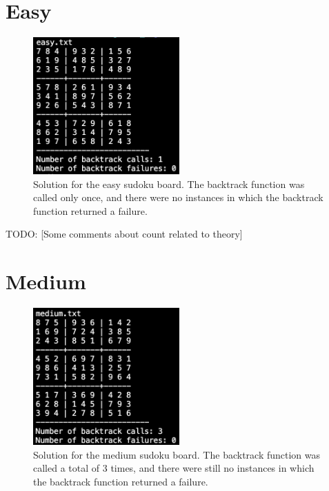 \documentclass{article}
\begin{document}
    \mainmatter

    \section*{Easy}

    \begin{figure}[H]
        \centering
        \includegraphics[width=0.5\textwidth]{Images/easy.png}
        \caption[Easy solution]{Solution for the easy sudoku board. The backtrack function was called only once, and there were no instances in which the backtrack function returned a failure.}
        \label{fig:Easy solution}
    \end{figure}

    TODO: [Some comments about count related to theory]

    \section*{Medium}

    \begin{figure}[H]
        \centering
        \includegraphics[width=0.5\textwidth]{Images/medium.png}
        \caption[Medium solution]{Solution for the medium sudoku board. The backtrack function was called a total of 3 times, and there were still no instances in which the backtrack function returned a failure.}
        \label{fig:Medium solution}
    \end{figure}
\end{document}
